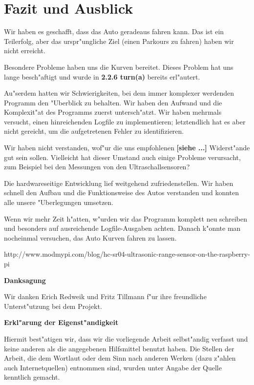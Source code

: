 \documentclass[a4paper,12pt]{article}
\begin{document}
\section{Fazit und Ausblick}\label{sec3}

Wir haben es geschafft, dass das Auto geradeaus fahren kann.
Das ist ein Teilerfolg, aber das urspr"ungliche Ziel (einen Parkours zu fahren) haben wir nicht erreicht.

Besondere Probleme haben uns die Kurven bereitet. Dieses Problem hat uns lange besch"aftigt und wurde in {\bf 2.2.6 turn(a)} bereits erl"autert.

Au"serdem hatten wir Schwierigkeiten, bei dem immer komplexer werdenden Programm den "Uberblick zu behalten.
Wir haben den Aufwand und die Komplexit"at des Programms zuerst untersch"atzt.
Wir haben mehrmals versucht, einen hinreichenden Logfile zu implementieren; letztendlich hat es aber nicht gereicht, um die aufgetretenen Fehler zu identifizieren.

Wir haben nicht verstanden, wof"ur die uns empfohlenen {\bf [siehe ...]} Widerst"ande gut sein sollen.
Vielleicht hat dieser Umstand auch einige Probleme verursacht, zum Beispiel bei den Messungen von den Ultraschallsensoren?

Die hardwareseitige Entwicklung lief weitgehend zufriedenstellen.
Wir haben schnell den Aufbau und die Funktionsweise des Autos verstanden und konnten alle unsere "Uberlegungen umsetzen.

Wenn wir mehr Zeit h"atten, w"urden wir das Programm komplett neu schreiben und besonders auf ausreichende Logfile-Ausgaben achten.
Danach k"onnte man nocheinmal versuchen, das Auto Kurven fahren zu lassen.

\bigskip


\begin{thebibliography}{99}
	\itemsep-2pt \small
	 http://www.modmypi.com/blog/hc-sr04-ultrasonic-range-sensor-on-the-raspberry-pi
\end{thebibliography}

\newpage


{\large\bf Danksagung}

\medskip

Wir danken Erich Redweik und Fritz Tillmann f"ur ihre freundliche Unterst"utzung bei dem Projekt.

\bigskip


{\large\bf Erkl"arung der Eigenst"andigkeit}

\medskip

Hiermit best"atigen wir, dass wir die vorliegende Arbeit selbst"andig verfasst und keine anderen als die angegebenen Hilfsmittel benutzt haben.
Die Stellen der Arbeit, die dem Wortlaut oder dem Sinn nach anderen Werken (dazu z"ahlen auch Internetquellen) entnommen sind, wurden unter Angabe der Quelle kenntlich gemacht.
\end{document}
